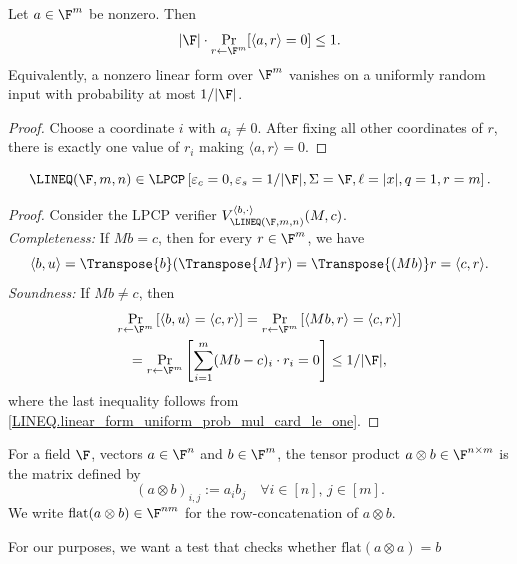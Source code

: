 \begin{lemma}
\label{LINEQ.linear_form_uniform_prob_mul_card_le_one}
\leanok
Let \(a\in\F^m\) be nonzero. Then
\[
  |\F|\cdot\Pr_{r\leftarrow\F^m}\!\left[\langle a,r\rangle=0\right]\leq 1.
\]
Equivalently, a nonzero linear form over \(\F^m\) vanishes on a uniformly
random input with probability at most \(1/|\F|\).
\end{lemma}
\begin{proof}\leanok
Choose a coordinate \(i\) with \(a_i\neq 0\). After fixing all other
coordinates of \(r\), there is exactly one value of \(r_i\) making
\(\langle a,r\rangle=0\).
\end{proof}

\begin{theorem}\label{LINEQ_LPCP}\leanok
  \[\LINEQ(\F,m,n) \in \LPCP\left[\varepsilon_c=0, \varepsilon_s= 1 / |\F|, \Sigma = \F, \ell = |x|, q = 1, r = m\right].\]
\end{theorem}
\begin{proof}\leanok
Consider the LPCP verifier \(V_{\LINEQ(\F,m,n)}^{\langle b, \cdot \rangle } (M,c)\).\\
\emph{Completeness:} If \(Mb =c\), then for every \(r \in \F^m\), we have \[\langle b, u \rangle = \Transpose{b} (\Transpose{M} r) = \Transpose{(Mb)} r = \langle c , r\rangle.\]
\emph{Soundness:} If \(Mb \neq c\), then 
\begin{gather*}
  \Pr_{r\leftarrow \F^m} \left[\langle b, u \rangle =  \langle c , r\rangle \right] = \Pr_{r\leftarrow \F^m} \left[\langle Mb, r \rangle =  \langle c , r\rangle \right] 
  \\= \Pr_{r\leftarrow \F^m} \left[ \sum_{i=1}^{m} (Mb - c)_{i} \cdot r_{i} =  0\right] \leq 1 / |\F|,
\end{gather*}
where the last inequality follows from \ref{LINEQ.linear_form_uniform_prob_mul_card_le_one}.
\end{proof}


For a field \(\F\), vectors \(a \in \F^n\) and \(b \in \F^m\), the tensor product \(a \otimes b \in \F^{n \times m}\)
is the matrix defined by
\[
  (a \otimes b)_{i,j} := a_i b_j \quad \forall i \in [n],\, j \in [m].
\]
We write \(\mathrm{flat}(a \otimes b) \in \F^{nm}\) for the row-concatenation of \(a \otimes b\).

For our purposes, we want a test that checks whether $\mathrm{flat}(a \otimes a) = b$

